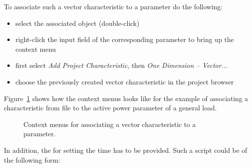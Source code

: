 To associate such a vector characteristic to a parameter do the following:
\begin{itemize}
  \item select the associated object (double-click)
  \item right-click the input field of the corresponding parameter to bring up the context menu
  \item first select \emph{Add Project Characteristic}, then \emph{One Dimension -- Vector...}
  \item choose the previously created vector characteristic in the project browser
\end{itemize} 
Figure~\ref{fig:add_characteristic_vector} shows how the context menus looks like for the example of associating a characteristic from file to the active power parameter of a general load.

\begin{figure}[h!]
\vspace*{2em}
\caption{Context menus for associating a vector characteristic to a parameter.}
\label{fig:add_characteristic_vector}
\end{figure}

\clearpage

In addition, the \dplscript for setting the time has to be provided.
Such a script could be of the following form:

